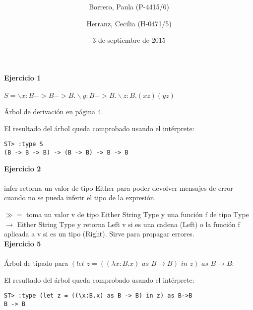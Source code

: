 \documentclass[12pt, a4paper]{article}
\title{
\vspace{2in}
\textmd{\textbf{\hmwkClassTitle}}\\
\vspace{0.1in}\large{\textit{\hmwkClassName}}
\vspace{3in}
}
\date{3 de septiembre de 2015}
\author{Borrero, Paula (P-4415/6) \and Herranz, Cecilia (H-0471/5) }
\begin{document}
\maketitle
\marginsize{2cm}{2cm}{2cm}{2cm}
\newpage
{\bf Ejercicio 1}\\
\\
$S = \backslash x:B->B->B.\backslash y:B->B.\backslash z:B.(x z) (y z)$

Árbol de derivación en página 4.

El resultado del árbol queda comprobado usando el intérprete:
\vspace{-0.5cm}
\begin{verbatim}
ST> :type S
(B -> B -> B) -> (B -> B) -> B -> B
\end{verbatim}

{\bf Ejercicio 2}\\
\\
infer retorna un valor de tipo Either para poder devolver mensajes de error cuando no se pueda inferir el tipo de la expresión.

$\gg =$ toma un valor v de tipo Either String Type y una función f de tipo Type $\rightarrow$ Either String Type y retorna Left v si es una cadena (Left) o la función f aplicada a v si es un tipo (Right). Sirve para propagar errores.
\\

{\bf Ejercicio 5}\\
\\
Árbol de tipado para $(let\,\, z = ((\lambda x : B. x)\,\, as\,\, B \rightarrow B)\,\, in\,\,z)\,\, as\,\, B \rightarrow B$:
\begin{center}
\begin{minipage}{\linewidth}
\end{minipage}
\end{center}

El resultado del árbol queda comprobado usando el intérprete:
\vspace{-0.5cm}
\begin{verbatim}
ST> :type (let z = ((\x:B.x) as B -> B) in z) as B->B
B -> B
\end{verbatim}
\end{document}
